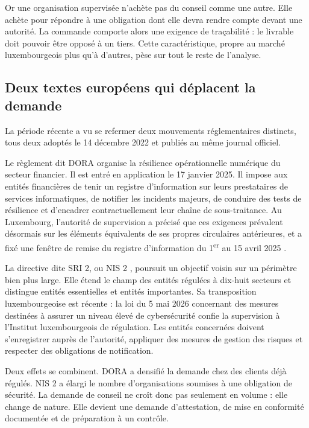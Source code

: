 Or une organisation supervisée n'achète pas du conseil comme une autre. Elle achète pour
répondre à une obligation dont elle devra rendre compte devant une autorité. La commande
comporte alors une exigence de traçabilité : le livrable doit pouvoir être opposé à un
tiers. Cette caractéristique, propre au marché luxembourgeois plus qu'à d'autres, pèse sur
tout le reste de l'analyse.

\subsection{Deux textes européens qui déplacent la demande}

La période récente a vu se refermer deux mouvements réglementaires distincts, tous deux
adoptés le 14 décembre 2022 et publiés au même journal officiel.

Le règlement dit DORA \cite{ue2022dora} organise la résilience opérationnelle numérique du
secteur financier. Il est entré en application le 17 janvier 2025. Il impose aux entités
financières de tenir un registre d'information sur leurs prestataires de services
informatiques, de notifier les incidents majeurs, de conduire des tests de résilience et
d'encadrer contractuellement leur chaîne de sous-traitance. Au Luxembourg, l'autorité de
supervision a précisé que ces exigences prévalent désormais sur les éléments équivalents de
ses propres circulaires antérieures, et a fixé une fenêtre de remise du registre
d'information du 1\textsuperscript{er} au 15 avril 2025 \cite{cssf2025dora}.

La directive dite SRI 2, ou NIS 2 \cite{ue2022nis2}, poursuit un objectif voisin sur un
périmètre bien plus large. Elle étend le champ des entités régulées à dix-huit secteurs et
distingue entités essentielles et entités importantes. Sa transposition luxembourgeoise est
récente : la loi du 5 mai 2026 concernant des mesures destinées à assurer un niveau élevé
de cybersécurité \cite{lux2026nis2} confie la
supervision à l'Institut luxembourgeois de
régulation. Les entités concernées doivent s'enregistrer auprès de l'autorité, appliquer des mesures de gestion des
risques et respecter des obligations de notification.

Deux effets se combinent. DORA a densifié la demande chez des clients déjà régulés. NIS 2 a
élargi le nombre d'organisations soumises à une obligation de sécurité. La demande de
conseil ne croît donc pas seulement en volume : elle change de nature. Elle devient une
demande d'attestation, de mise en conformité documentée et de préparation à un contrôle.

